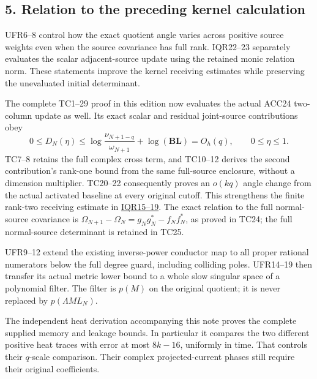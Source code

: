 \documentclass[11pt]{article}
\begin{document}
\subsection{5. Relation to the preceding kernel calculation}\label{relation-to-the-preceding-kernel-calculation}

UFR6--8 control how the exact quotient angle varies across positive source weights even when the source covariance has full rank. IQR22--23 separately evaluates the scalar adjacent-source update using the retained monic relation norm. These statements improve the kernel receiving estimates while preserving the unevaluated initial determinant.

The complete TC1--29 proof in this edition now evaluates the actual ACC24 two-column update as well. Its exact scalar and residual joint-source contributions obey \[
0\le D_N(\eta)\le
\log\frac{\nu_{N+1-q}}{\omega_{N+1}}+\log(\mathbf B\mathbf L)=O_h(q),
\qquad0\le\eta\le1.                                           \tag{UFR24}
\] TC7--8 retains the full complex cross term, and TC10--12 derives the second contribution's rank-one bound from the same full-source enclosure, without a dimension multiplier. TC20--22 consequently proves an \(o(kq)\) angle change from the actual activated baseline at every original cutoff. This strengthens the finite rank-two receiving estimate in \href{https://github.com/KokunoYumeto/zeta-function-research-reader/blob/ab120cf974feb26a31d77b07458b6da52f912ea4/workbenches/splitzero-tandem/continuations/20260921-inverse-quotient/INVERSE_QUOTIENT_RECEIVERS.tex}{IQR15--19}. The exact relation to the full normal-source covariance is \(\Omega_{N+1}-\Omega_N=g_Ng_N^*-f_Nf_N^*\), as proved in TC24; the full normal-source determinant is retained in TC25.

UFR9--12 extend the existing inverse-power conductor map to all proper rational numerators below the full degree guard, including colliding poles. UFR14--19 then transfer its actual metric lower bound to a whole slow singular space of a polynomial filter. The filter is \(p(M)\) on the original quotient; it is never replaced by \(p(\Lambda ML_N)\).

The independent heat derivation accompanying this note proves the complete supplied memory and leakage bounds. In particular it compares the two different positive heat traces with error at most \(8k-16\), uniformly in time. That controls their \(q\)-scale comparison. Their complex projected-current phases still require their original coefficients.
\end{document}
